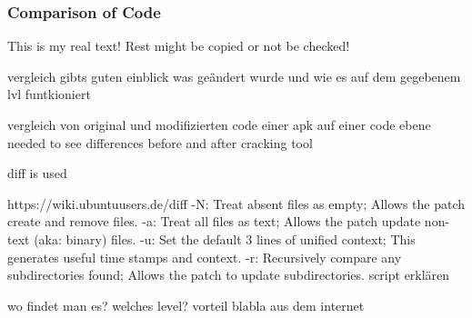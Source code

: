 \subsubsection{Comparison of Code}\label{subsubsection:forensics-tools-diff}
This is my real text! Rest might be copied or not be checked!


vergleich gibts guten einblick was geändert wurde und wie es auf dem gegebenem lvl funtkioniert\newline

vergleich von original und modifizierten code einer apk auf einer code ebene\newline
needed to see differences before and after cracking tool\newline

diff is used\newline

https://wiki.ubuntuusers.de/diff\newline
-N: Treat absent files as empty; Allows the patch create and remove files.\newline
-a: Treat all files as text; Allows the patch update non-text (aka: binary) files.\newline
-u: Set the default 3 lines of unified context; This generates useful time stamps and context.\newline
-r: Recursively compare any subdirectories found; Allows the patch to update subdirectories.\newline
script erklären\newline



wo findet man es?\newline
welches level?\newline
vorteil\newline
blabla aus dem internet\newline
